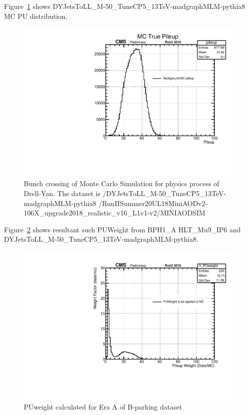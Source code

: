 Figure~\ref{fig:MCPU} shows DYJetsToLL\_M-50\_TuneCP5\_13TeV-madgraphMLM-pythia8 MC PU distribution.
\begin{figure}[h!]
  \label{fig:MCPU}
  \centering
  \includegraphics[width=0.67\linewidth]{figs/NVtx_DYJetsToLL_M-50_try.pdf}
	\caption{Bunch crossing of Monte Carlo Simulation for physics process of Drell-Yan. The dataset is /DYJetsToLL\_M-50\_TuneCP5\_13TeV-madgraphMLM-pythia8
\newline/RunIISummer20UL18MiniAODv2-106X\_upgrade2018\_realistic\_v16\_L1v1-v2/\newline MINIAODSIM}

\end{figure}

Figure~\ref{fig:PUWeight9} shows resultant such PUWeight from BPH1\_A HLT\_Mu9\_IP6 and DYJetsToLL\_M-50\_TuneCP5\_13TeV-madgraphMLM-pythia8.
\begin{figure}[h!]
  \label{fig:PUWeight9}
  \centering
  \includegraphics[width=0.67\linewidth]{figs/NVtx_PUWeight.pdf}
  \caption{PUweight calculated for Era A of B-parking dataset}

\end{figure}
